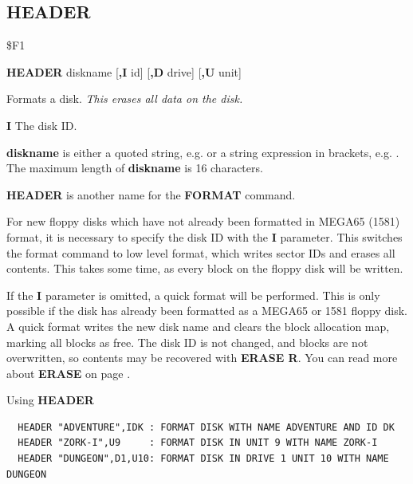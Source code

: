 \subsection{HEADER}
\begin{description}[leftmargin=2cm,style=nextline]
\item [Token:] \$F1
\item [Format:] {\bf HEADER} diskname [{\bf,I} id] [{\bf,D} drive] [{\bf,U} unit]
\item [Usage:]
   Formats a disk. {\em This erases all data on the disk.}

   {\bf I} The disk ID.

   {\bf diskname} is either a quoted string, e.g.  or
   a string expression in brackets, e.g. .
   The maximum length of {\bf diskname} is 16 characters.

   \drivedefinition

   \unitdefinition

\item [Remarks:] {\bf HEADER} is another name for the {\bf FORMAT} command.

   For new floppy disks which have not already been formatted in MEGA65 (1581) format,
   it is necessary to specify the disk ID with the
   {\bf I} parameter. This switches the format command to low level
   format, which writes sector IDs and erases all contents.
   This takes some time, as every block on the floppy disk will be written.

   If the {\bf I} parameter is omitted, a quick format will
   be performed. This is only possible if the disk has already been formatted
   as a MEGA65 or 1581 floppy disk.
   A quick format writes the new disk name and clears the
   block allocation map, marking all blocks as free.
   The disk ID is not changed, and blocks are not overwritten,
   so contents may be recovered with {\bf ERASE R}.
   You can read more about {\bf ERASE} on page \pageref{BASIC 65 Commands!ERASE}.

\item [Examples:] Using {\bf HEADER}
\begin{tcolorbox}[colback=black,coltext=white]
\verbatimfont{\codefont}
\begin{verbatim}
  HEADER "ADVENTURE",IDK : FORMAT DISK WITH NAME ADVENTURE AND ID DK
  HEADER "ZORK-I",U9     : FORMAT DISK IN UNIT 9 WITH NAME ZORK-I
  HEADER "DUNGEON",D1,U10: FORMAT DISK IN DRIVE 1 UNIT 10 WITH NAME DUNGEON
\end{verbatim}
\end{tcolorbox}
\end{description}

